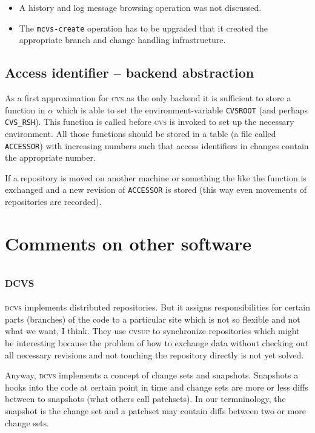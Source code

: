 \documentclass[fleqn, 10pt, a4paper]{article}
\begin{document}
\begin{itemize}
\item A history and log message browsing operation was not
discussed.
\item The \texttt{mcvs-create} operation has to be upgraded that
it created the appropriate branch and change handling infrastructure.
\end{itemize}

\subsection{Access identifier -- backend abstraction}

As a first approximation for \textsc{cvs} as the only backend
it is sufficient to store a function in $\alpha$ which is able to
set the environment-variable \texttt{CVSROOT} (and perhaps
\texttt{CVS\_RSH}). This function is called before \textsc{cvs}
is invoked to set up the necessary environment.
All those functions should be stored in a table (a file called
\texttt{ACCESSOR}) with increasing numbers such that access
identifiers in changes contain the appropriate number.

If a repository is moved on another machine or something the like
the function is exchanged and a new revision of \texttt{ACCESSOR} is
stored (this way even movements of repositories are recorded).


\section{Comments on other software}

\subsection{\textsc{dcvs}}

\textsc{dcvs} implements distributed repositories. But it assigns
responsibilities for certain parts (branches) of the code to
a particular site which is not so flexible and not what we want, I think.
They use \textsc{cvsup} to synchronize repositories which might be
interesting because the problem of how to exchange data without checking
out all necessary revisions and not touching the repository directly is
not yet solved.
 
Anyway, \textsc{dcvs} implements a concept of change sets and snapshots.
Snapshots a hooks into the code at certain point in time and change sets
are more or less diffs between to snapshots (what others call patchsets).
In our termninology, the snapshot is the change set and a patchset may
contain diffs between two or more change sets.
\end{document}
